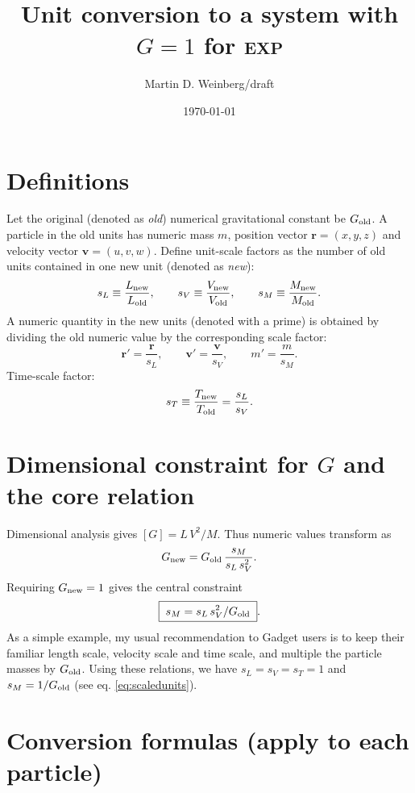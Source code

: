 \documentclass[11pt]{article}
\begin{document}
\title{Unit conversion to a system with \(G=1\) for \textsc{exp}}
\author{Martin D. Weinberg/draft}
\date{\today}
\maketitle
\section{Definitions}

Let the original (denoted as \emph{old}) numerical gravitational
constant be \(G_{\rm old}\). A particle in the old units has numeric
mass \(m\), position vector \(\mathbf{r}=(x,y,z)\) and velocity vector
\(\mathbf{v}=(u,v,w)\).  Define unit-scale factors as the number of
old units contained in one new unit (denoted as \emph{new}):
\begin{equation}
  s_L \equiv \frac{L_{\rm new}}{L_{\rm old}},\qquad
  s_V \equiv \frac{V_{\rm new}}{V_{\rm old}},\qquad
  s_M \equiv \frac{M_{\rm new}}{M_{\rm old}}.
  \label{eq:scalefactors}
\end{equation}
A numeric quantity in the new units (denoted with a prime) is obtained
by dividing the old numeric value by the corresponding scale factor:
\begin{equation}
  \mathbf{r}'=\frac{\mathbf{r}}{s_L},\qquad
  \mathbf{v}'=\frac{\mathbf{v}}{s_V},\qquad
  m'=\frac{m}{s_M}.
  \label{eq:scaledunits}
\end{equation}
Time-scale factor:
\[
  s_T \equiv \frac{T_{\rm new}}{T_{\rm old}}=\frac{s_L}{s_V}.
\]

\section{Dimensional constraint for \(G\) and the core relation}

Dimensional analysis gives \([G]=L\,V^2/M\). Thus numeric values
transform as
\[
  G_{\rm new} = G_{\rm old}\,\frac{s_M}{s_L\,s_V^2}.
\]
Requiring \(G_{\rm new}=1\) gives the central constraint
\[\boxed{ \; s_M = s_L\,s_V^{2}/G_{\rm old}\; }.\]
As a simple example, my usual recommendation to Gadget users is to
keep their familiar length scale, velocity scale and time scale, and
multiple the particle masses by \(G_{\rm old}\).  Using these
relations, we have \(s_L=s_V=s_T=1\) and \(s_M = 1/G_{\rm old}\) (see
eq. \ref{eq:scaledunits}).

\section{Conversion formulas (apply to each particle)}
\end{document}
